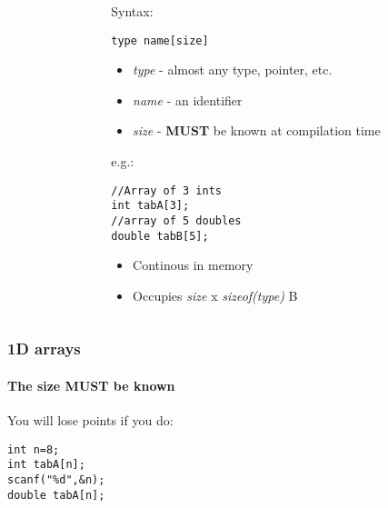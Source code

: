 \documentclass[10pt]{beamer}
\begin{document}
\begin{frame}[fragile]
\begin{columns}
\begin{column}{0.65\textwidth}
\begin{tikzpicture}[x=1.5cm,y=0.3cm]
\end{tikzpicture}
    \end{column}
    \begin{column}{0.5\textwidth}
Syntax:
\begin{lstlisting}
type name[size]
\end{lstlisting}
\begin{itemize}
  \item \textit{type} - almost any type, pointer, etc.
  \item \textit{name} - an identifier
  \item \textit{size} - \textbf{MUST} be known at compilation time 
\end{itemize}
e.g.:
\begin{lstlisting}
//Array of 3 ints
int tabA[3];
//array of 5 doubles
double tabB[5];
\end{lstlisting}
\begin{itemize}
  \item Continous in memory
  \item Occupies \textit{size} x \textit{sizeof(type)} B
\end{itemize}
    \end{column}
  \end{columns}
\end{frame}

\begin{frame}[fragile]
  \frametitle{1D arrays}
  \framesubtitle{The size \textbf{MUST} be known}
  You will lose points if you do:
\begin{lstlisting}
int n=8;
int tabA[n];
scanf("%d",&n);
double tabA[n];
\end{lstlisting}
\end{frame}
\end{document}
